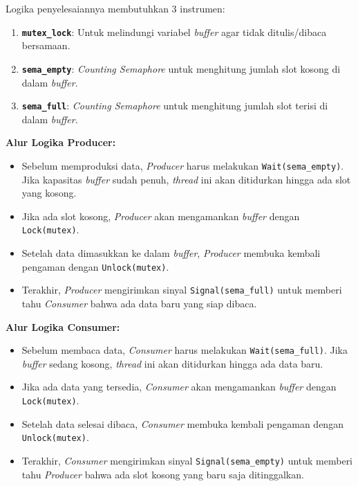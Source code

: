 Logika penyelesaiannya membutuhkan 3 instrumen:
\begin{enumerate}
	\item \textbf{\texttt{mutex\_lock}}: Untuk melindungi variabel \textit{buffer} agar tidak ditulis/dibaca bersamaan.
	\item \textbf{\texttt{sema\_empty}}: \textit{Counting Semaphore} untuk menghitung jumlah slot kosong di dalam \textit{buffer}.
	\item \textbf{\texttt{sema\_full}}: \textit{Counting Semaphore} untuk menghitung jumlah slot terisi di dalam \textit{buffer}.
\end{enumerate}

\noindent \textbf{Alur Logika Producer:}
\begin{itemize}
	\item Sebelum memproduksi data, \textit{Producer} harus melakukan \texttt{Wait(sema\_empty)}. Jika kapasitas \textit{buffer} sudah penuh, \textit{thread} ini akan ditidurkan hingga ada slot yang kosong.
	\item Jika ada slot kosong, \textit{Producer} akan mengamankan \textit{buffer} dengan \texttt{Lock(mutex)}.
	\item Setelah data dimasukkan ke dalam \textit{buffer}, \textit{Producer} membuka kembali pengaman dengan \texttt{Unlock(mutex)}.
	\item Terakhir, \textit{Producer} mengirimkan sinyal \texttt{Signal(sema\_full)} untuk memberi tahu \textit{Consumer} bahwa ada data baru yang siap dibaca.
\end{itemize}

\noindent \textbf{Alur Logika Consumer:}
\begin{itemize}
	\item Sebelum membaca data, \textit{Consumer} harus melakukan \texttt{Wait(sema\_full)}. Jika \textit{buffer} sedang kosong, \textit{thread} ini akan ditidurkan hingga ada data baru.
	\item Jika ada data yang tersedia, \textit{Consumer} akan mengamankan \textit{buffer} dengan \texttt{Lock(mutex)}.
	\item Setelah data selesai dibaca, \textit{Consumer} membuka kembali pengaman dengan \texttt{Unlock(mutex)}.
	\item Terakhir, \textit{Consumer} mengirimkan sinyal \texttt{Signal(sema\_empty)} untuk memberi tahu \textit{Producer} bahwa ada slot kosong yang baru saja ditinggalkan.
\end{itemize}

